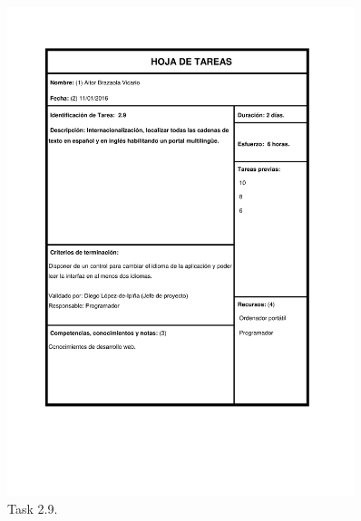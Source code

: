 \documentclass{DeustoFDP}
\begin{document}
\begin{figure}[H]
	\centering
	\includegraphics[width=0.9\textwidth]{fig/Tareas/29}
	\caption{Task 2.9.}
	\label{fig:t29}
\end{figure}
\end{document}
